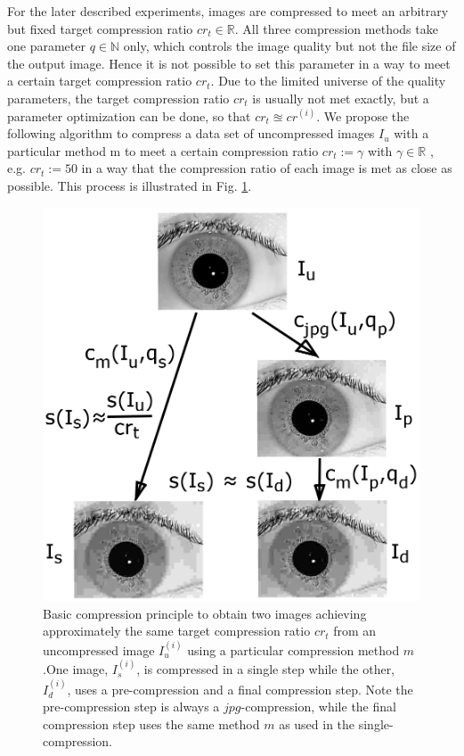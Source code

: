 \documentclass[10pt,twocolumn,letterpaper]{article}
\begin{document}
For the later described experiments, images are compressed to meet an arbitrary but fixed target compression ratio $cr_t \in \mathbb{R}$. All three compression methods take one parameter $q \in \mathbb{N}$ only, which controls the image quality but not the file size of the output image. Hence it is not possible to set this parameter in a way to meet a certain target compression ratio $cr_t$. Due to the limited universe of the quality parameters, the target compression ratio $cr_t$ is usually not met exactly, but a parameter optimization can be done, so that $cr_t \approxeq cr^{(i)}$. We propose the following algorithm to compress a data set of uncompressed images $I_u$ with a particular method m to meet a certain compression ratio $cr_t := \gamma$ with $\gamma \in \mathbb{R}$ , e.g. $cr_t := 50$ in a way that the compression ratio of each image is met as close as possible. This process is illustrated in Fig. \ref{fig:comprScheme}.

\begin{figure}[h]
	\begin{center}
		
	\includegraphics[width=0.7\linewidth]{img/comprScheme}
\end{center}
	\caption{Basic compression principle to obtain two images achieving approximately the same target compression ratio $cr_t$ from an uncompressed image $I_u^{(i)}$ using a particular compression method $m$.One image, $I_s^{(i)}$, is compressed in a single step while the other, $I_d^{(i)}$, uses a pre-compression and a final compression step. Note the pre-compression step is always a $jpg$-compression, while the final compression step uses the same method $m$ as used in the single-compression.}
	\label{fig:comprScheme}
	
\end{figure}
\end{document}
